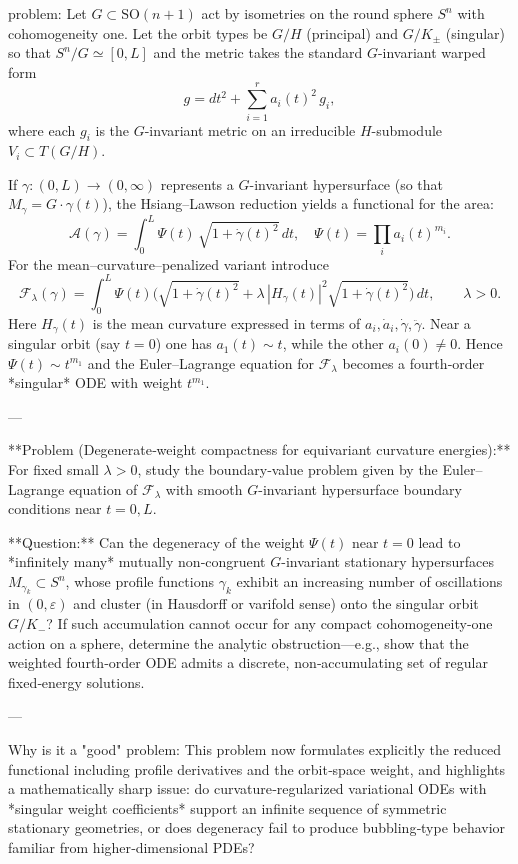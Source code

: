 problem:  
Let \(G\subset \mathrm{SO}(n+1)\) act by isometries on the round sphere \(S^{n}\) with cohomogeneity one.  Let the orbit types be \(G/H\) (principal) and \(G/K_\pm\) (singular) so that \(S^{n}/G \simeq [0,L]\) and the metric takes the standard \(G\)-invariant warped form  
\[
g = dt^{2} + \sum_{i=1}^{r} a_i(t)^{2}\, g_i,
\]
where each \(g_i\) is the \(G\)-invariant metric on an irreducible \(H\)-submodule \(V_i\subset T(G/H)\).

If \(\gamma\!:\!(0,L)\to (0,\infty)\) represents a \(G\)-invariant hypersurface (so that \(M_\gamma = G\cdot \gamma(t)\)\!), the Hsiang–Lawson reduction yields a functional for the area:
\[
\mathcal{A}(\gamma)=\int_0^L \Psi(t)\,\sqrt{1+\dot{\gamma}(t)^{2}}\, dt,\quad 
\Psi(t)=\prod_{i} a_i(t)^{m_i}.
\]
For the mean–curvature–penalized variant introduce
\[
\mathcal{F}_{\lambda}(\gamma)=\int_0^L \Psi(t)
\big( \sqrt{1+\dot{\gamma}(t)^{2}}  + \lambda\, |H_\gamma(t)|^{2}\sqrt{1+\dot{\gamma}(t)^{2}}\big)\, dt,
\qquad \lambda>0.
\]
Here \(H_\gamma(t)\) is the mean curvature expressed in terms of \(a_i,\dot{a}_i,\dot{\gamma},\ddot{\gamma}\).  
Near a singular orbit (say \(t=0\)) one has \(a_1(t)\!\sim\! t\), while the other \(a_i(0)\!\ne\!0\). Hence \(\Psi(t)\sim t^{m_1}\) and the Euler–Lagrange equation for \(\mathcal{F}_\lambda\) becomes a fourth‑order *singular* ODE with weight \(t^{m_1}\).

---

**Problem (Degenerate‑weight compactness for equivariant curvature energies):**  
For fixed small \(\lambda>0\), study the boundary‑value problem given by the Euler–Lagrange equation of \(\mathcal{F}_\lambda\) with smooth \(G\)-invariant hypersurface boundary conditions near \(t=0,L\).  

**Question:**  
Can the degeneracy of the weight \(\Psi(t)\) near \(t=0\) lead to *infinitely many* mutually non‑congruent \(G\)-invariant stationary hypersurfaces \(M_{\gamma_k}\subset S^{n}\), whose profile functions \(\gamma_k\) exhibit an increasing number of oscillations in \((0,\varepsilon)\) and cluster (in Hausdorff or varifold sense) onto the singular orbit \(G/K_-\)?  
If such accumulation cannot occur for any compact cohomogeneity‑one action on a sphere, determine the analytic obstruction—e.g., show that the weighted fourth‑order ODE admits a discrete, non‑accumulating set of regular fixed‑energy solutions.

---

Why is it a "good" problem:  
This problem now formulates explicitly the reduced functional including profile derivatives and the orbit‑space weight, and highlights a mathematically sharp issue:  
do curvature‑regularized variational ODEs with *singular weight coefficients* support an infinite sequence of symmetric stationary geometries, or does degeneracy fail to produce bubbling‑type behavior familiar from higher‑dimensional PDEs?

